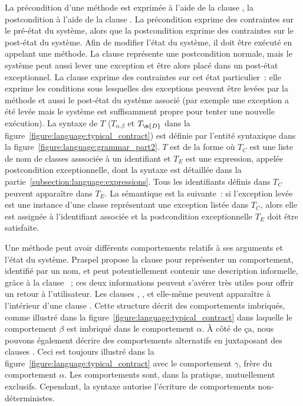 La précondition d'une méthode est exprimée à l'aide de la clause \arequires, la
postcondition à l'aide de la clause \aensures. La précondition exprime des
contraintes sur le {\strong pré-état} du système, alors que la postcondition
exprime des contraintes sur le {\strong post-état} du système. Afin de modifier
l'état du système, il doit être exécuté en appelant une méthode. La clause
\aensures représente une {\strong postcondition normale}, mais le système peut
aussi lever une exception et être alors placé dans un {\strong post-état
exceptionnel}. La clause \athrowable exprime des contraintes sur cet état
particulier~: elle exprime les conditions sous lesquelles des exceptions peuvent
être levées par la méthode et aussi le post-état du système associé (par exemple
une exception a été levée mais le système est suffisamment propre pour tenter
une nouvelle exécution). La syntaxe de $T$ ($T_{\alpha.\beta}$ et $T_\m{D}$ dans
la figure~\ref{figure:language:typical_contract}) est définie par l'entité
syntaxique  dans la
figure~\ref{figure:language:grammar_part2}. $T$ est de la forme  où $T_C$ est une liste de nom de classes asssociée à un identifiant et
$T_E$ est une expression, appelée {\strong postcondition exceptionnelle}, dont
la syntaxe est détaillée dans la partie~\ref{subsection:language:expressions}.
Tous les identifiants définis dans $T_C$ peuvent apparaître dans $T_E$. La
sémantique est la suivante~: si l'exception levée est une instance d'une classe
représentant une exception listée dans $T_C$, alors elle est assignée à
l'identifiant associée et la postcondition exceptionnelle $T_E$ doit être
satisfaite.

Une méthode peut avoir différents {\strong comportements} relatifs à ses
arguments et l'état du système. Praspel propose la clause \abehavior pour
représenter un comportement, identifié par un nom, et peut potentiellement
contenir une description informelle, grâce à la clause \adescription~; ces deux
informations peuvent s'avérer très utiles pour offrir un retour à l'utilisateur.
Les clauses \arequires, \aensures, \athrowable et \abehavior elle-même peuvent
apparaître à l'intérieur d'une clause \abehavior. Cette structure décrit des
comportements {\strong imbriqués}, comme illustré dans la
figure~\ref{figure:language:typical_contract} dans laquelle le comportement
$\beta$ est imbriqué dans le comportement $\alpha$. À côté de ça, nous pouvons
également décrire des comportements {\strong alternatifs} en juxtaposant des
clauses \abehavior. Ceci est toujours illustré dans la
figure~\ref{figure:language:typical_contract} avec le comportement $\gamma$,
frère du comportement $\alpha$. Les comportements sont, dans la pratique,
{\strong mutuellement exclusifs}. Cependant, la syntaxe autorise l'écriture de
comportements non-déterministes.

